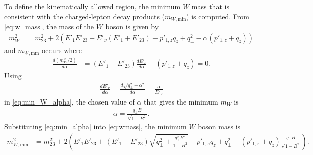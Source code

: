 To define the kinematically allowed region, the minimum $W$ mass that is consistent with the charged-lepton decay products ($m_{W, \mathrm{min}}$) is computed. From \cref{eq:w_mass}, the mass of the $W$ boson is given by
\begin{align}
m_W^2 &=  m_{23}^2 +2\left(E'_1E'_{23} + E'_\nu(E'_1 + E'_{23}) - p'_{1,z}q_z + q_{\perp}^2 -\alpha(p'_{1,z} + q_z) \right) \label{eq:wmass}
\end{align}
%
and $m_{W, \mathrm{min}}$ occurs where
\begin{align}
\frac{d(m_W^2/2)}{d\alpha} &=  (E'_1 + E'_{23})\frac{dE'_\nu}{d\alpha} - (p'_{1,z} + q_z) = 0. \label{eq:min_W_alpha}
\end{align}
Using
%
\begin{align}
\frac{dE'_\nu}{d\alpha} = \frac{d\sqrt{q_{\perp}^2+\alpha^2}}{d\alpha} = \frac{\alpha}{E'_\nu} \nonumber
\end{align}
%
in \cref{eq:min_W_alpha}, the chosen value of $\alpha$ that gives the minimum $m_W$ is
%
\begin{align}
\alpha =  \frac{q_\perp B }{\sqrt{1-B^2}}. \label{eq:min_alpha}
\end{align}
%
Substituting \cref{eq:min_alpha} into \cref{eq:wmass}, the minimum $W$ boson mass is
\begin{align}
m^2_{W,\mathrm{min}} &=  m_{23}^2 +2\left(E'_1E'_{23}  + (E'_1+E'_{23})\sqrt{q_{\perp}^2 + \frac{q_\perp^2 B^2 }{1-B^2}  } -p'_{1,z}q_z + q_{\perp}^2- (p'_{1,z} + q_z )\frac{q_\perp B }{\sqrt{1-B^2}}\right).  \nonumber  %
\end{align} 

